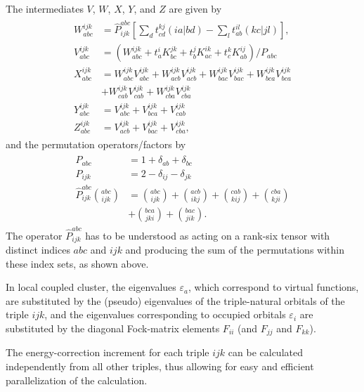The intermediates $V$, $W$, $X$, $Y$, and $Z$ are given by
\begin{align}
  \begin{split}
    W_{abc}^{ijk} &= \hat{P}^{abc}_{ijk} \left[ \sum_d t^{kj}_{cd}(ia|bd) -\sum_l t_{ab}^{il}(kc|jl) \right],\\
    V_{abc}^{ijk} &= \left(W_{abc}^{ijk}+t_a^i K^{jk}_{bc} + t_b^j K_{ac}^{ik}+t_c^k K_{ab}^{ij} \right)/P_{abc}\\
    X_{abc}^{ijk} &= W_{abc}^{ijk}V_{abc}^{ijk}+W_{acb}^{ijk}V_{acb}^{ijk}+W_{bac}^{ijk}V_{bac}^{ijk}
                   +W_{bca}^{ijk}V_{bca}^{ijk}\\
                  &+W_{cab}^{ijk}V_{cab}^{ijk}+W_{cba}^{ijk}V_{cba}^{ijk} \\
    Y_{abc}^{ijk} &= V_{abc}^{ijk}+V_{bca}^{ijk}+V_{cab}^{ijk}\\
    Z_{abc}^{ijk} &= V_{acb}^{ijk}+V_{bac}^{ijk}+V_{cba}^{ijk},
  \end{split}
\end{align}
and the permutation operators/factors by
\begin{align}
  \begin{split}
    P_{abc} &= 1+\delta_{ab}+\delta_{bc}\\
    P_{ijk} &= 2-\delta_{ij}-\delta_{jk}\\
    \hat{P}^{abc}_{ijk} {abc\choose ijk} &= {abc\choose ijk}+{acb\choose ikj}+{cab\choose kij}+{cba\choose kji}\\
                                         &+ {bca\choose jki}+{bac\choose jik}.
  \end{split}
\end{align}
The operator $\hat{P}^{abc}_{ijk}$ has to be understood as acting on a rank-six tensor with distinct indices $abc$
and $ijk$ and producing the sum of the permutations within these index sets, as shown above.

In local coupled cluster, the eigenvalues $\varepsilon_a$, which correspond to virtual functions, are substituted
by the (pseudo) eigenvalues of the triple-natural orbitals of the triple $ijk$, and the eigenvalues
corresponding to occupied orbitals $\varepsilon_i$ are substituted by the diagonal Fock-matrix elements
$F_{ii}$ (and $F_{jj}$ and $F_{kk}$).

The energy-correction increment for each triple $ijk$ can be calculated independently from all other triples, thus
allowing for easy and efficient parallelization of the calculation.
